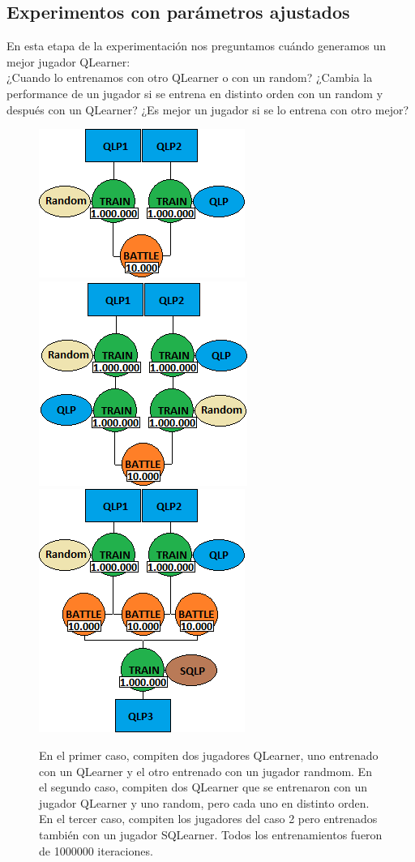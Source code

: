 \documentclass[10pt, a4paper]{article}
\begin{document}
\subsection{Experimentos con parámetros ajustados}

En esta etapa de la experimentación nos preguntamos cuándo generamos un mejor jugador QLearner: \\
¿Cuando lo entrenamos con otro QLearner o con un random?
¿Cambia la performance de un jugador si se entrena en distinto orden con un random y después con un QLearner?
¿Es mejor un jugador si se lo entrena con otro mejor?

\begin{figure}[H]
  \begin{minipage}[c]{1\textwidth}
  \includegraphics[scale=0.5]{E1.png}
  \includegraphics[scale=0.5]{E2.png}
  \includegraphics[scale=0.5]{E3.png}
  \caption{En el primer caso, compiten dos jugadores QLearner, uno entrenado con un QLearner y el otro entrenado con un jugador randmom.
  En el segundo caso, compiten dos QLearner que se entrenaron con un jugador QLearner y uno random, pero cada uno en distinto orden.
  En el tercer caso, compiten los jugadores del caso 2 pero entrenados también con un jugador SQLearner.  Todos los entrenamientos fueron de 1000000 iteraciones. }
  \end{minipage}
\end{figure}
\end{document}
